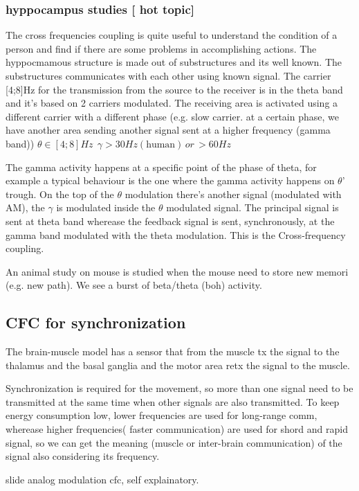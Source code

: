 \subsubsection{hyppocampus studies [ hot topic]}
The cross frequencies coupling is quite useful to understand the condition of a person and find if there are some problems in accomplishing actions.
The hyppocmamous structure is made out of substructures and its well known. The substructures communicates with each other using known signal. The carrier [4;8]Hz for the transmission from the source to the receiver is in the theta band and it's based on 2 carriers modulated. The receiving area is activated using a different carrier with a different phase  (e.g. slow carrier. at a certain phase, we have another area sending another signal sent at a higher frequency (gamma band))
$\theta \in [4;8]Hz ~~ \gamma > 30Hz (\text{human}) \, or \, >60Hz$

The gamma activity happens at a specific point of the phase of theta, for example a typical behaviour is the one where the gamma activity happens on $\theta$' trough. On the top of the $\theta$ modulation there's another signal (modulated with AM), the $\gamma$ is modulated inside the $\theta$ modulated signal. The principal signal is sent at theta band wherease the feedback signal is sent, synchronously, at the gamma band modulated with the theta modulation. This is the Cross-frequency coupling.


An animal study on mouse is studied when the mouse need to store new memori (e.g. new path). We see a burst of beta/theta (boh) activity.

\subsection{CFC for synchronization}
The brain-muscle model has a sensor that from the muscle tx the signal to the thalamus and the basal ganglia and the motor area retx the signal to the muscle.

Synchronization is required for the movement, so more than one signal need to be transmitted at the same time when other signals are also transmitted. To keep energy consumption low, lower frequencies are used for long-range comm, wherease higher frequencies( faster communication) are used for shord and rapid signal, so we can get the meaning (muscle or inter-brain communication) of the signal also considering its frequency.

slide analog modulation cfc, self explainatory.

